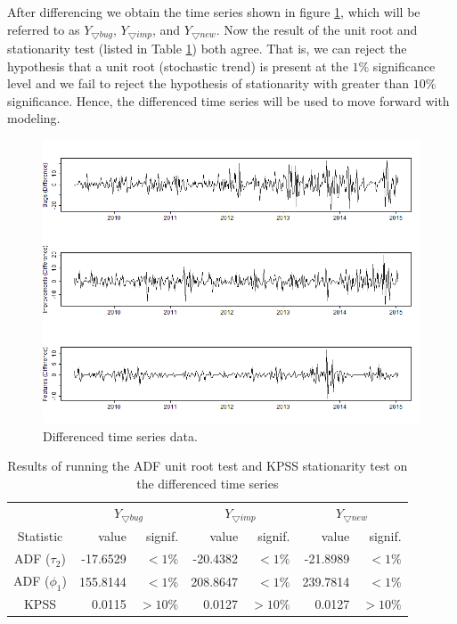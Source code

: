 \documentclass[a4paper]{scrartcl}
\begin{document}
After differencing we obtain the time series shown in figure \ref{fig:differenced_time_series}, which will be referred to as $Y_{\bigtriangledown bug}$, $Y_{\bigtriangledown imp}$, and $Y_{\bigtriangledown new}$. Now the result of the unit root and stationarity test (listed in Table \ref{tab:first_diff_stationarity_results}) both agree. That is, we can reject the hypothesis that a unit root (stochastic trend) is present at the $1\%$  significance level and we fail to reject the hypothesis of stationarity with greater than $10\%$ significance. Hence, the differenced time series will be used to move forward with modeling.

\begin{figure}[htbp!]
\begin{center}
\includegraphics[width=\textwidth]{assets/time_series_diff}
\caption{Differenced time series data.}
\label{fig:differenced_time_series}
\end{center}
\end{figure}

\begin{table}[h!]
  \centering
  \begin{tabular}{ c | r r | r r | r r }
      & \multicolumn{2}{|c|}{$Y_{\bigtriangledown bug}$} & \multicolumn{2}{|c|}{$Y_{\bigtriangledown imp}$} & \multicolumn{2}{|c}{$Y_{\bigtriangledown new}$} \\
    Statistic & value & signif. & value & signif. & value & signif. \\
    \hline
    ADF ($\tau_2$) & -17.6529 & $< 1\%$ & -20.4382 & $< 1\%$ & -21.8989 & $< 1\%$ \\
    ADF ($\phi_1$) & 155.8144 & $< 1\%$ & 208.8647 & $< 1\%$ & 239.7814 & $< 1\%$ \\
    KPSS & 0.0115 & $> 10\%$ & 0.0127 & $> 10\%$ & 0.0127 & $> 10\%$ \\
    \hline
  \end{tabular}
\caption{Results of running the ADF unit root test and KPSS stationarity test on the differenced time series}
\label{tab:first_diff_stationarity_results}
\end{table}
\end{document}
